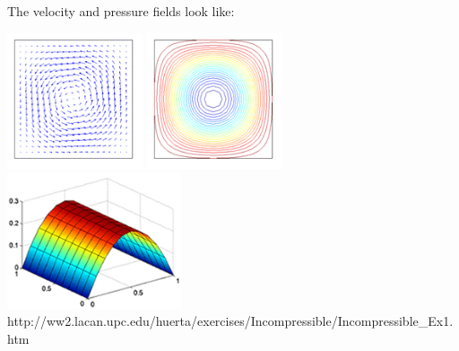 The velocity and pressure fields look like:

\begin{center}
\includegraphics[height=4cm]{images/mms/Ex1_Q2Q1_velo.png}
\includegraphics[height=4cm]{images/mms/Ex1_Q2Q1_streamlines.png}
\includegraphics[height=4cm]{images/mms/Ex1_Q2Q1_pres.png}\\
{\small http://ww2.lacan.upc.edu/huerta/exercises/Incompressible/Incompressible\_Ex1.htm}
\end{center}

